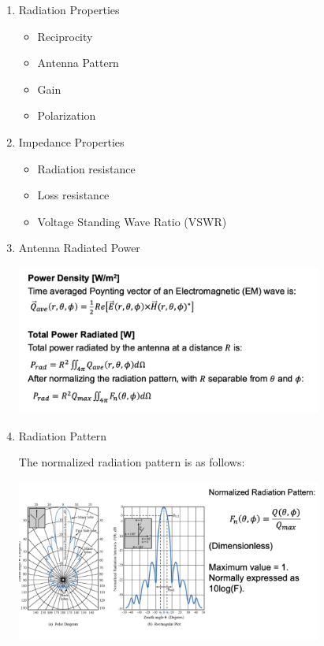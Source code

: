 \documentclass[10pt]{article}
\begin{document}
\begin{enumerate}

	\item Radiation Properties
		
		\begin{itemize}
		
			\item Reciprocity
			\item Antenna Pattern
			\item Gain
			\item Polarization
			
		\end{itemize}
	\item Impedance Properties
		\begin{itemize}
			\item Radiation resistance
			\item Loss resistance
			\item Voltage Standing Wave Ratio (VSWR)
		
		\end{itemize}
		
	\item Antenna Radiated Power
	
	\includegraphics[width=0.79\textwidth]{figs/antennaradiatedpower.png}
	
		
		
	\item Radiation Pattern
	
		 The normalized radiation pattern is as follows:
		 
		 \includegraphics[width=0.79\textwidth]{figs/normalizedradiationpattern.png}
		 

\end{enumerate}
\end{document}
